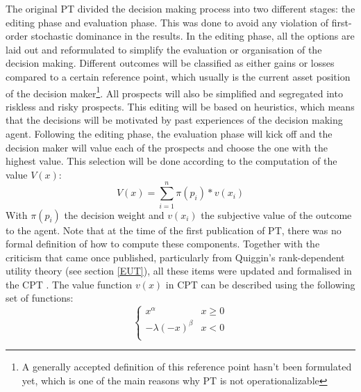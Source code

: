 The original PT divided the decision making process into two different stages: the editing phase and evaluation phase. This was done to avoid any violation of first-order stochastic dominance in the results. In the editing phase, all the options are laid out and reformulated to simplify the evaluation or organisation of the decision making. Different outcomes will be classified as either gains or losses compared to a certain reference point, which usually is the current asset position of the decision maker\footnote{A generally accepted definition of this reference point hasn't been formulated yet, which is one of the main reasons why PT is not operationalizable}. All prospects will also be simplified and segregated into riskless and risky prospects. This editing will be based on heuristics, which means that the decisions will be motivated by past experiences of the decision making agent. 
\newline \newline \noindent
Following the editing phase, the evaluation phase will kick off and the decision maker will value each of the prospects and choose the one with the highest value. This selection will be done according to the computation of the value $V(x)$:
\begin{equation}
    V(x) = \sum_{i=1}^{n} \pi(p_i)*v(x_i)
\end{equation}
\noindent
With $\pi(p_i)$ the decision weight and $v(x_i)$ the subjective value of the outcome to the agent. Note that at the time of the first publication of PT, there was no formal definition of how to compute these components. Together with the criticism that came once published, particularly from Quiggin's rank-dependent utility theory (see section \ref{EUT}), all these items were updated and formalised in the CPT \cite{prospect2}.
\newline \newline \noindent
The value function $v(x)$ in CPT can be described using the following set of functions:
\[   \left\{
\begin{array}{ll}
      x^\alpha & x \geq 0 \\
       -\lambda(-x)^\beta & x < 0 \\
\end{array} 
\right. \]
\newline 
